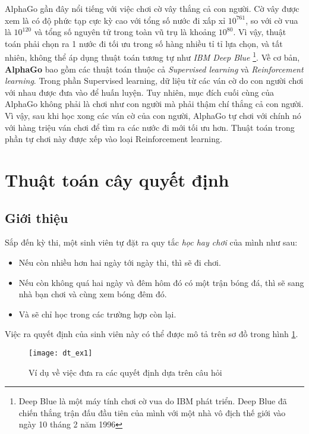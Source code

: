 \documentclass[../main-report.tex]{subfiles}
\begin{document}
\begin{example}
AlphaGo gần đây nổi tiếng với việc chơi cờ vây thắng cả con người. Cờ vây được xem là có độ phức tạp cực kỳ cao với tổng số nước đi xấp xỉ \(10^{761} \), so với cờ vua là \(10^{120} \) và tổng số nguyên tử trong toàn vũ trụ là khoảng \(10^{80}\). Vì vậy, thuật toán phải chọn ra 1 nước đi tối ưu trong số hàng nhiều tỉ tỉ lựa chọn, và tất nhiên, không thể áp dụng thuật toán tương tự như \emph{IBM Deep Blue} \footnote{Deep Blue là một máy tính chơi cờ vua do IBM phát triển. Deep Blue đã chiến thắng trận đấu đầu tiên của mình với một nhà vô địch thế giới vào ngày 10 tháng 2 năm 1996}. Về cơ bản, \textbf{AlphaGo} bao gồm các thuật toán thuộc cả \emph{Supervised learning} và \emph{Reinforcement learning}. Trong phần Supervised learning, dữ liệu từ các ván cờ do con người chơi với nhau được đưa vào để huấn luyện. Tuy nhiên, mục đích cuối cùng của AlphaGo không phải là chơi như con người mà phải thậm chí thắng cả con người. Vì vậy, sau khi học xong các ván cờ của con người, AlphaGo tự chơi với chính nó với hàng triệu ván chơi để tìm ra các nước đi mới tối ưu hơn. Thuật toán trong phần tự chơi này được xếp vào loại Reinforcement learning. 
\end{example}
\section{Thuật toán cây quyết định}
\subsection{Giới thiệu}
Sắp đến kỳ thi, một sinh viên tự đặt ra quy tắc \textit{học hay chơi} của mình như sau:

\begin{itemize}
\item Nếu còn nhiều hơn hai ngày tới ngày thi, thì sẽ đi chơi.
\item Nếu còn không quá hai ngày và đêm hôm đó có một trận bóng đá, thì sẽ sang nhà bạn chơi và cùng xem bóng đêm đó.
\item Và sẽ chỉ học trong các trường hợp còn lại.
\end{itemize}

Việc ra quyết định của sinh viên này có thể được mô tả trên sơ đồ trong hình \ref{fig:dt_ex1}.

\begin{figure}[ht!]
\centering\texttt{[image: dt\_ex1]}
\caption{Ví dụ về việc đưa ra các quyết định dựa trên câu hỏi}
\label{fig:dt_ex1}
\end{figure}
\end{document}
